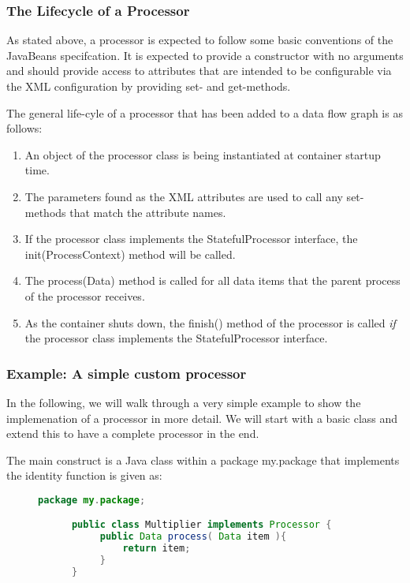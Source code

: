 \subsubsection{\label{sec:processorLifecycle}The Lifecycle of a Processor}
As stated above, a processor is expected to follow some basic
conventions of the JavaBeans specifcation. It is expected to provide a
constructor with no arguments and should provide access to attributes
that are intended to be configurable via the XML configuration by
providing {\ttfamily set}- and {\ttfamily get}-methods.

The general life-cyle of a processor that has been added to a data flow
graph is as follows:

\begin{enumerate}
  \item An object of the processor class is being instantiated at
    container startup time.
  \item The parameters found as the XML attributes are used to
    call any {\ttfamily set}-methods that match the attribute names.
  \item If the processor class implements the {\ttfamily StatefulProcessor}
    interface, the {\ttfamily init(ProcessContext)} method will be called.
  \item The {\ttfamily process(Data)} method is called for all data items
    that the parent process of the processor receives.
  \item As the container shuts down, the {\ttfamily finish()} method of
    the processor is called {\em if} the processor class implements the
    {\ttfamily StatefulProcessor} interface.
\end{enumerate}




\subsubsection{\label{sec:exampleProcessor}Example: A simple custom processor}
In the following, we will walk through a very simple example to show
the implemenation of a processor in more detail. We will start with a
basic class and extend this to have a complete processor in the end.

The main construct is a Java class within a package {\ttfamily my.package}
that implements the identity function is given as:

\begin{figure}[h!]
  \centering
  \begin{lstlisting}[language=Java]
      package my.package;

      public class Multiplier implements Processor {
           public Data process( Data item ){
               return item;
           }
      }
  \end{lstlisting}
\end{figure}

